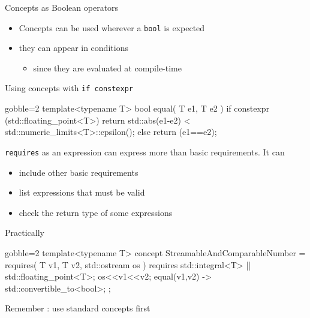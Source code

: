 \begin{frame}[fragile]
    \begin{block}{Concepts as Boolean operators}
      \begin{itemize}
        \item Concepts can be used wherever a \texttt{bool} is expected
        \item they can appear in  conditions
          \begin{itemize}
          \item since they are evaluated at compile-time
          \end{itemize}
      \end{itemize}
    \end{block}
    \begin{exampleblock}{Using concepts with \texttt{if constexpr}}
      \small
      \begin{cppcode*}{gobble=2}
      template<typename T>
      bool equal( T e1, T e2 )
      {
        if constexpr (std::floating_point<T>) {
          return std::abs(e1-e2)
                   < std::numeric_limits<T>::epsilon();
        } else {
          return (e1==e2);
        }
      }
      \end{cppcode*}
    \end{exampleblock}
\end{frame}

\begin{frame}[fragile]
    \begin{block}{\texttt{requires} as an expression}
         can express more than basic requirements. It can
        \begin{itemize}
            \item include other basic requirements
            \item list expressions that must be valid
            \item check the return type of some expressions
        \end{itemize}
    \end{block}
    \begin{exampleblock}{Practically}
      \small
      \begin{cppcode*}{gobble=2}
      template<typename T>
      concept StreamableAndComparableNumber =
      requires( T v1, T v2, std::ostream os ) {
        requires std::integral<T> || std::floating_point<T>;
        os<<v1<<v2;
        { equal(v1,v2) } -> std::convertible_to<bool>;
      };
      \end{cppcode*}
    \end{exampleblock}
    \begin{block}{}
      Remember : use standard concepts first
    \end{block}
\end{frame}

